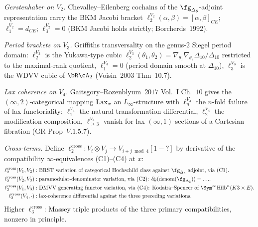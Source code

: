 \emph{Gerstenhaber on $V_2$.} Chevalley--Eilenberg cochains of the
$\fg_{\Delta_5}$-adjoint representation carry the BKM Jacobi
bracket $\ell_2^{V_2}(\alpha,\beta)=[\alpha,\beta]_{CE}$;
$\ell_1^{V_2}=d_{CE}$; $\ell_3^{V_2}=0$ (BKM Jacobi holds
strictly; Borcherds~$1992$).

\emph{Period brackets on $V_3$.} Griffiths transversality on the
genus-$2$ Siegel period domain: $\ell_2^{V_3}$ is the
Yukawa-type cubic
$\ell_2^{V_3}(\theta_1,\theta_2)=\nabla_{\theta_1}\nabla_{\theta_2}
\Delta_{10}/\Delta_{10}$ restricted to the maximal-rank
quotient, $\ell_1^{V_3}=0$ (period domain smooth at
$\Delta_{10}$), $\ell_3^{V_3}$ is the WDVV cubic of $\bR\cA_2$
(Voisin~$2003$ Thm~$10.7$).

\emph{Lax coherence on $V_4$.} Gaitsgory--Rozenblyum~$2017$
Vol.~I Ch.~$10$ gives the $(\infty,2)$-categorical mapping
$\mathrm{Lax}_x$ an $L_\infty$-structure with $\ell_n^{V_4}$ the
$n$-fold failure of lax functoriality; $\ell_1^{V_4}$ the
natural-transformation differential, $\ell_2^{V_4}$ the modification
composition, $\ell_{\geq 3}^{V_4}$ vanish for lax
$(\infty,1)$-sections of a Cartesian fibration (GR Prop~$V.1.5.7$).

\emph{Cross-terms.} Define $\ell_2^{\mathrm{cross}}:V_i\otimes V_j\to
V_{i+j\bmod 4}[1-?]$ by derivative of the compatibility
$\infty$-equivalences (C1)--(C4) at $x$:
\begin{align*}
\ell_2^{\mathrm{cross}}(V_1,V_2)
&: \text{BRST variation of categorical Hochschild class
against $\fg_{\Delta_5}$ adjoint, via (C1).}\\
\ell_2^{\mathrm{cross}}(V_2,V_3)
&: \text{paramodular-denominator variation, via (C2):
$\partial_\theta(\text{denom}(\fg_{\Delta_5}))=\ldots$.}\\
\ell_2^{\mathrm{cross}}(V_1,V_3)
&: \text{DMVV generating functor variation, via (C4):
Kodaira--Spencer of $\Sym^\infty\mathrm{Hilb}^n(K3\times E)$.}\\
\ell_2^{\mathrm{cross}}(V_4,\cdot)
&: \text{lax-coherence differential against the three
preceding variations.}
\end{align*}
Higher $\ell_3^{\mathrm{cross}}$: Massey triple products of the
three primary compatibilities, nonzero in principle.

